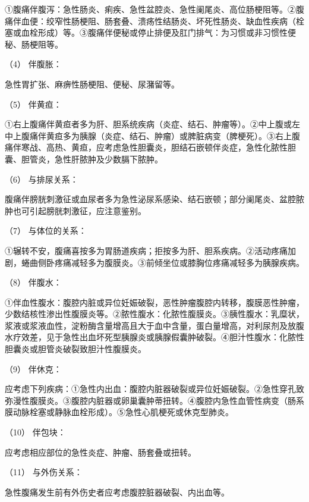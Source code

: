 ①腹痛伴腹泻：急性肠炎、痢疾、急性盆腔炎、急性阑尾炎、高位肠梗阻等。②腹痛伴血便：绞窄性肠梗阻、肠套叠、溃疡性结肠炎、坏死性肠炎、缺血性疾病（栓塞或血栓形成）等。③腹痛伴便秘或停止排便及肛门排气：为习惯或非习惯性便秘、肠梗阻等。

\hypertarget{text00026.htmlux5cux23CHP1-10-2-1-4-3-4}{}
（4） 伴腹胀：

急性胃扩张、麻痹性肠梗阻、便秘、尿潴留等。

\hypertarget{text00026.htmlux5cux23CHP1-10-2-1-4-3-5}{}
（5） 伴黄疸：

①右上腹痛伴黄疸者多为肝、胆系统疾病（炎症、结石、肿瘤等）。②中上腹或左中上腹痛伴黄疸多为胰腺（炎症、结石、肿瘤）或脾脏病变（脾梗死）。③右上腹痛伴寒战、高热、黄疸，应考虑急性胆囊炎，胆结石嵌顿伴炎症，急性化脓性胆囊、胆管炎，急性肝脓肿及少数膈下脓肿。

\hypertarget{text00026.htmlux5cux23CHP1-10-2-1-4-3-6}{}
（6） 与排尿关系：

腹痛伴膀胱刺激征或血尿者多为急性泌尿系感染、结石嵌顿；部分阑尾炎、盆腔脓肿也可引起膀胱刺激征，应注意鉴别。

\hypertarget{text00026.htmlux5cux23CHP1-10-2-1-4-3-7}{}
（7） 与体位的关系：

①辗转不安，腹痛喜按多为胃肠道疾病；拒按多为肝、胆系疾病。②活动疼痛加剧，蜷曲侧卧疼痛减轻多为腹膜炎。③前倾坐位或膝胸位疼痛减轻多为胰腺疾病。

\hypertarget{text00026.htmlux5cux23CHP1-10-2-1-4-3-8}{}
（8） 伴腹水：

①伴血性腹水：腹腔内脏或异位妊娠破裂，恶性肿瘤腹腔内转移，腹膜恶性肿瘤，少数结核性渗出性腹膜炎等。②脓性腹水：化脓性腹膜炎。③胰性腹水：乳糜状，浆液或浆液血性，淀粉酶含量增高且大于血中含量，蛋白量增高，对利尿剂及放腹水疗效差，见于急性出血坏死型胰腺炎或胰腺假囊肿破裂。④胆汁性腹水：化脓性胆囊炎或胆管炎破裂致胆汁性腹膜炎。

\hypertarget{text00026.htmlux5cux23CHP1-10-2-1-4-3-9}{}
（9） 伴休克：

应考虑下列疾病：①急性内出血：腹腔内脏器破裂或异位妊娠破裂。②急性穿孔致弥漫性腹膜炎。③腹腔内脏器或卵巢囊肿蒂扭转。④腹腔内急性血管性病变（肠系膜动脉栓塞或静脉血栓形成）。⑤急性心肌梗死或休克型肺炎。

\hypertarget{text00026.htmlux5cux23CHP1-10-2-1-4-3-10}{}
（10） 伴包块：

应考虑相应部位的急性炎症、肿瘤、肠套叠或扭转。

\hypertarget{text00026.htmlux5cux23CHP1-10-2-1-4-3-11}{}
（11） 与外伤关系：

急性腹痛发生前有外伤史者应考虑腹腔脏器破裂、内出血等。

